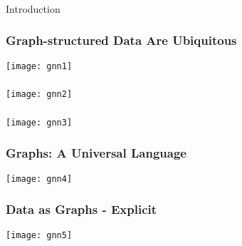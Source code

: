 \begin{frame}[fragile]\frametitle{}
\begin{center}
{\Large Introduction}
\end{center}
\end{frame}


\begin{frame}[fragile]\frametitle{ Graph-structured Data Are Ubiquitous }

\begin{center}
\texttt{[image: gnn1]}
\end{center}	  

\end{frame}

\begin{frame}[fragile]\frametitle{}

\begin{center}
\texttt{[image: gnn2]}
\end{center}	  

\end{frame}

\begin{frame}[fragile]\frametitle{}

\begin{center}
\texttt{[image: gnn3]}
\end{center}	  

\end{frame}

\begin{frame}[fragile]\frametitle{Graphs: A Universal Language }

\begin{center}
\texttt{[image: gnn4]}
\end{center}	  

\end{frame}


\begin{frame}[fragile]\frametitle{Data as Graphs - Explicit }

\begin{center}
\texttt{[image: gnn5]}
\end{center}	  

\end{frame}

